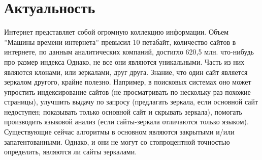 \section{Актуальность}
Интернет представляет собой огромную коллекцию информации. Объем ''Машины
времени интернета'' превысил 10 петабайт, количество сайтов в интернете, по
данным аналитических компаний, достигло 620,5 млн. %
что-нибудь про размер индекса
Однако, не все они являются уникальными. Часть из них являются клонами, или
зеркалами, друг друга. Знание, что один сайт является зеркалом другого, крайне
полезно. Например, в поисковых системах оно может упростить индексирование
сайтов (не просматривать по нескольку раз похожие страницы), улучшить выдачу по
запросу (предлагать зеркала, если основной сайт недоступен; показывать только
основной сайт и скрывать зеркала), помогать производить языковой анализ (если сайты-зеркала отличаются только языком). %
Существующие сейчас алгоритмы в основном являются закрытыми и/или
запатентованными. Однако, и они не могут со стопроцентной точностью определить,
являются ли сайты зеркалами.